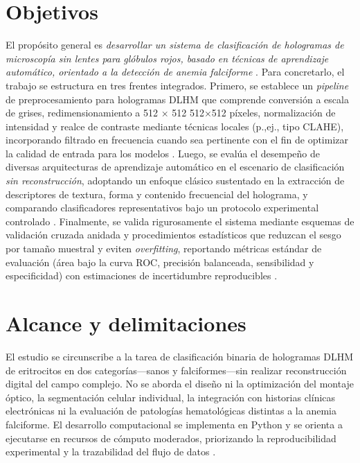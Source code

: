\section{Objetivos}
El propósito general es \emph{desarrollar un sistema de clasificación de hologramas de microscopía sin lentes para glóbulos rojos, basado en técnicas de aprendizaje automático, orientado a la detección de anemia falciforme} \cite{Amann2019,BuitragoDuque2023,OConnor2020}. Para concretarlo, el trabajo se estructura en tres frentes integrados. Primero, se establece un \textit{pipeline} de preprocesamiento para hologramas DLHM que comprende conversión a escala de grises, redimensionamiento a 
512
×
512
512×512 píxeles, normalización de intensidad y realce de contraste mediante técnicas locales (p.,ej., tipo CLAHE), incorporando filtrado en frecuencia cuando sea pertinente con el fin de optimizar la calidad de entrada para los modelos \cite{Amann2019,BuitragoDuque2023}. Luego, se evalúa el desempeño de diversas arquitecturas de aprendizaje automático en el escenario de clasificación \emph{sin reconstrucción}, adoptando un enfoque clásico sustentado en la extracción de descriptores de textura, forma y contenido frecuencial del holograma, y comparando clasificadores representativos bajo un protocolo experimental controlado \cite{OConnor2020,BuitragoDuque2023}. Finalmente, se valida rigurosamente el sistema mediante esquemas de validación cruzada anidada y procedimientos estadísticos que reduzcan el sesgo por tamaño muestral y eviten \emph{overfitting}, reportando métricas estándar de evaluación (área bajo la curva ROC, precisión balanceada, sensibilidad y especificidad) con estimaciones de incertidumbre reproducibles \cite{Vabalas2019,Tsamardinos2022}.

\section{Alcance y delimitaciones}
El estudio se circunscribe a la tarea de clasificación binaria de hologramas DLHM de eritrocitos en dos categorías—sanos y falciformes—sin realizar reconstrucción digital del campo complejo. No se aborda el diseño ni la optimización del montaje óptico, la segmentación celular individual, la integración con historias clínicas electrónicas ni la evaluación de patologías hematológicas distintas a la anemia falciforme. El desarrollo computacional se implementa en Python y se orienta a ejecutarse en recursos de cómputo moderados, priorizando la reproducibilidad experimental y la trazabilidad del flujo de datos \cite{Amann2019,BuitragoDuque2023,OConnor2020}.

